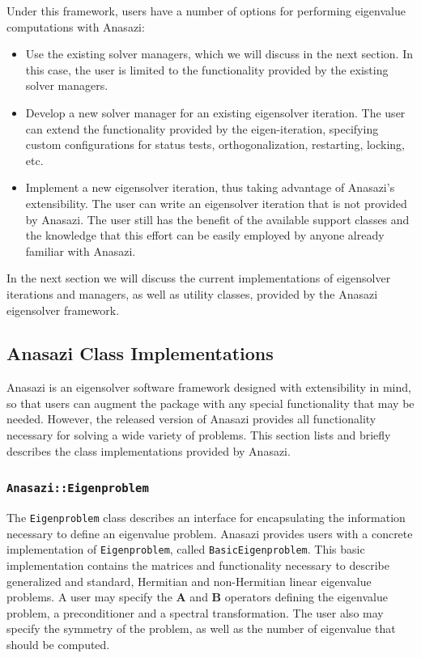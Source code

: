 \documentclass[acmtoms,acmnow]{acmtrans2m}
\newcommand{\aspace}[1]{\texttt{#1}}
\begin{document}
Under this framework, users have a number of options for performing eigenvalue
computations with Anasazi:
\begin{itemize}
\item
Use the existing solver managers, which we will discuss in the next section. 
In this case, the user is limited to the functionality provided by the existing 
solver managers.
\item
Develop a new solver manager for an existing eigensolver iteration.
The user can extend the functionality provided by the eigen-iteration,
specifying custom configurations for status tests, orthogonalization, restarting, 
locking, etc.
\item
Implement a new eigensolver iteration, thus taking advantage of Anasazi's extensibility. 
The user can write an eigensolver iteration that is not provided by Anasazi. 
The user still has the benefit of the available support classes 
and the knowledge that this effort can be easily employed by anyone already 
familiar with Anasazi.
\end{itemize}
In the next section we will discuss the current implementations of
eigensolver iterations and managers, as well as utility classes, provided
by the Anasazi eigensolver framework.

\subsection{Anasazi Class Implementations}
\label{subsec:anasazi:classes}

Anasazi is an eigensolver software framework designed with extensibility in mind, 
so that users can augment the package with any special functionality that may be
needed. However, the released version of Anasazi provides all
functionality necessary for solving a wide variety of problems. This
section lists and briefly describes the class implementations provided
by Anasazi.


\subsubsection{\aspace{Anasazi::Eigenproblem}}

The \aspace{Eigenproblem} class describes an interface for encapsulating the information
necessary to define an eigenvalue problem.  Anasazi provides users with a concrete
implementation of \aspace{Eigenproblem}, called \aspace{BasicEigenproblem}. This basic
implementation contains the matrices and functionality necessary to describe generalized
and standard, Hermitian and non-Hermitian linear eigenvalue problems. A user may specify
the $\mathbf{A}$ and $\mathbf{B}$ operators defining the eigenvalue problem, a
preconditioner and a spectral transformation. The user also may specify the symmetry of
the problem, as well as the number of eigenvalue that should be computed.
\end{document}
